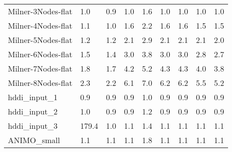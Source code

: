 \begin{table}
\begin{adjustbox}{max totalheight=\textheight}
\begin{tabular}{|l|ll|llllll|}
    Milner-3Nodes-flat & 1.0   & 0.9    & 1.0  & 1.6  & 1.0  & 1.0  & 1.0   & 1.0   \\
    Milner-4Nodes-flat & 1.1   & 1.0    & 1.6  & 2.2  & 1.6  & 1.6  & 1.5   & 1.5   \\
    Milner-5Nodes-flat & 1.2   & 1.2    & 2.1  & 2.9  & 2.1  & 2.1  & 2.1   & 2.0   \\
    Milner-6Nodes-flat & 1.5   & 1.4    & 3.0  & 3.8  & 3.0  & 3.0  & 2.8   & 2.7   \\
    Milner-7Nodes-flat & 1.8   & 1.7    & 4.2  & 5.2  & 4.3  & 4.3  & 4.0   & 3.8   \\
    Milner-8Nodes-flat & 2.3   & 2.2    & 6.1  & 7.0  & 6.2  & 6.2  & 5.5   & 5.2   \\ \hline
    hddi\_input\_1     & 0.9   & 0.9    & 0.9  & 1.0  & 0.9  & 0.9  & 0.9   & 0.9   \\
    hddi\_input\_2     & 1.0   & 0.9    & 0.9  & 1.2  & 0.9  & 0.9  & 0.9   & 0.9   \\
    hddi\_input\_3     & 179.4 & 1.0    & 1.1  & 1.4  & 1.1  & 1.1  & 1.1   & 1.1   \\
    ANIMO\_small       & 1.1   & 1.1    & 1.1  & 1.8  & 1.1  & 1.1  & 1.1   & 1.1   \\ \hline
    \end{tabular}
\end{adjustbox}
\end{table}

